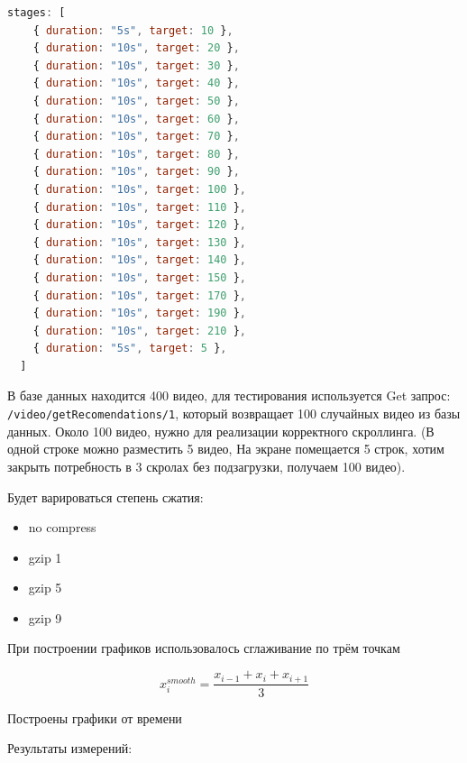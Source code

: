 \documentclass[12pt]{article}
\begin{document}
\begin{lstlisting}[language=JavaScript]
  stages: [
    { duration: "5s", target: 10 },
    { duration: "10s", target: 20 },
    { duration: "10s", target: 30 },
    { duration: "10s", target: 40 },
    { duration: "10s", target: 50 },
    { duration: "10s", target: 60 },
    { duration: "10s", target: 70 },
    { duration: "10s", target: 80 },
    { duration: "10s", target: 90 },
    { duration: "10s", target: 100 },
    { duration: "10s", target: 110 },
    { duration: "10s", target: 120 },
    { duration: "10s", target: 130 },
    { duration: "10s", target: 140 },
    { duration: "10s", target: 150 },
    { duration: "10s", target: 170 },
    { duration: "10s", target: 190 },
    { duration: "10s", target: 210 },
    { duration: "5s", target: 5 },
  ]
\end{lstlisting}

В базе данных находится 400 видео, для тестирования используется Get запрос:
\verb|/video/getRecomendations/1|, который возвращает 100 случайных видео из базы данных. Около 100 видео, нужно для реализации корректного
скроллинга. (В одной строке можно разместить 5 видео, На экране помещается 5 строк, хотим закрыть
потребность в 3 скролах без подзагрузки, получаем 100 видео).

Будет варироваться степень сжатия:
\begin{itemize}
    \item no compress
    \item gzip 1
    \item gzip 5
    \item gzip 9
\end{itemize}

При построении графиков использовалось сглаживание по трём точкам

\[
    x^{smooth}_{i} = \frac{x_{i-1} + x_{i} + x_{i+1}}{3}
\]

Построены графики от времени

Результаты измерений:
\end{document}
